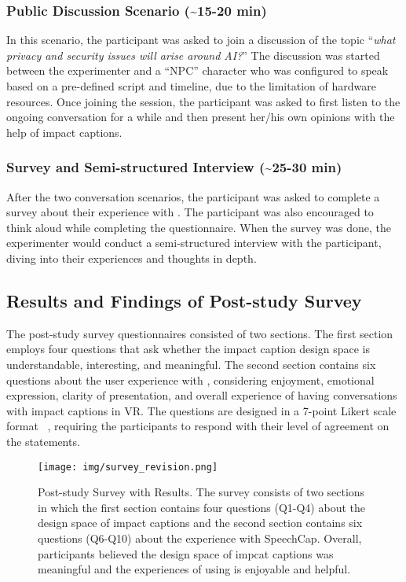 \subsubsection{Public Discussion Scenario (\textasciitilde15-20 min)}
In this scenario, the participant was asked to join a discussion of the topic ``\textit{what privacy and security issues will arise around AI?}''
The discussion was started between the experimenter and a ``NPC'' character who was configured to speak based on a pre-defined script and timeline, due to the limitation of hardware resources. Once joining the session, the participant was asked to first listen to the ongoing conversation for a while and then present her/his own opinions with the help of impact captions.

\subsubsection{Survey and Semi-structured Interview (\textasciitilde25-30 min)}
After the two conversation scenarios, the participant was asked to complete a survey about their experience with \system{}. The participant was also encouraged to think aloud while completing the questionnaire. When the survey was done, the experimenter would conduct a semi-structured interview with the participant, diving into their experiences and thoughts in depth.


\subsection{Results and Findings of Post-study Survey}
The post-study survey questionnaires consisted of two sections. The first section employs four questions that ask whether the impact caption design space is understandable, interesting, and meaningful.
The second section contains six questions about the user experience with \system{}, considering enjoyment, emotional expression, clarity of presentation, and overall experience of having conversations with impact captions in VR. The questions are designed in a 7-point Likert scale format ~\cite{joshi2015likert}, requiring the participants to respond with their level of agreement on the statements.

\begin{figure}[htb]
    \texttt{[image: img/survey\_revision.png]}
    \caption{
        Post-study Survey with Results. 
        The survey consists of two sections in which the first section contains four questions (Q1-Q4) about the design space of impact captions and the second section contains six questions (Q6-Q10) about the experience with SpeechCap. 
        Overall, participants believed the design space of impcat captions was meaningful and the experiences of using \system{} is enjoyable and helpful.
    }
    \label{fig:survey}
\end{figure}

